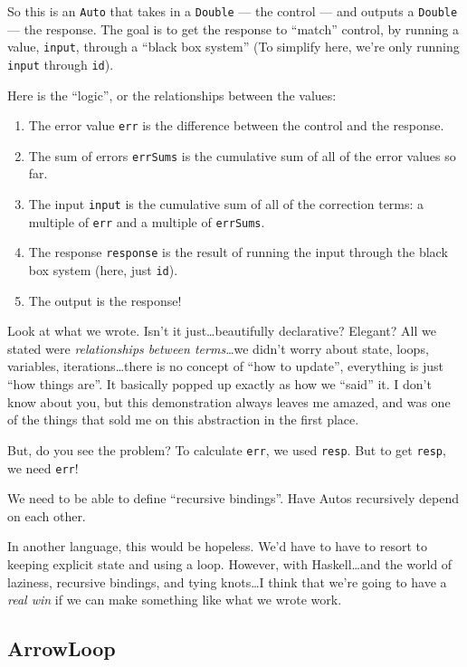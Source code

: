 \documentclass[]{article}
\begin{document}
So this is an \texttt{Auto} that takes in a \texttt{Double} --- the control ---
and outputs a \texttt{Double} --- the response. The goal is to get the response
to ``match'' control, by running a value, \texttt{input}, through a ``black box
system'' (To simplify here, we're only running \texttt{input} through
\texttt{id}).

Here is the ``logic'', or the relationships between the values:

\begin{enumerate}
\def\labelenumi{\arabic{enumi}.}
\tightlist
\item
  The error value \texttt{err} is the difference between the control and the
  response.
\item
  The sum of errors \texttt{errSums} is the cumulative sum of all of the error
  values so far.
\item
  The input \texttt{input} is the cumulative sum of all of the correction terms:
  a multiple of \texttt{err} and a multiple of \texttt{errSums}.
\item
  The response \texttt{response} is the result of running the input through the
  black box system (here, just \texttt{id}).
\item
  The output is the response!
\end{enumerate}

Look at what we wrote. Isn't it just\ldots beautifully declarative? Elegant? All
we stated were \emph{relationships between terms}\ldots we didn't worry about
state, loops, variables, iterations\ldots there is no concept of ``how to
update'', everything is just ``how things are''. It basically popped up exactly
as how we ``said'' it. I don't know about you, but this demonstration always
leaves me amazed, and was one of the things that sold me on this abstraction in
the first place.

But, do you see the problem? To calculate \texttt{err}, we used \texttt{resp}.
But to get \texttt{resp}, we need \texttt{err}!

We need to be able to define ``recursive bindings''. Have Autos recursively
depend on each other.

In another language, this would be hopeless. We'd have to have to resort to
keeping explicit state and using a loop. However, with Haskell\ldots and the
world of laziness, recursive bindings, and tying knots\ldots I think that we're
going to have a \emph{real win} if we can make something like what we wrote
work.

\subsection{ArrowLoop}\label{arrowloop}
\end{document}
